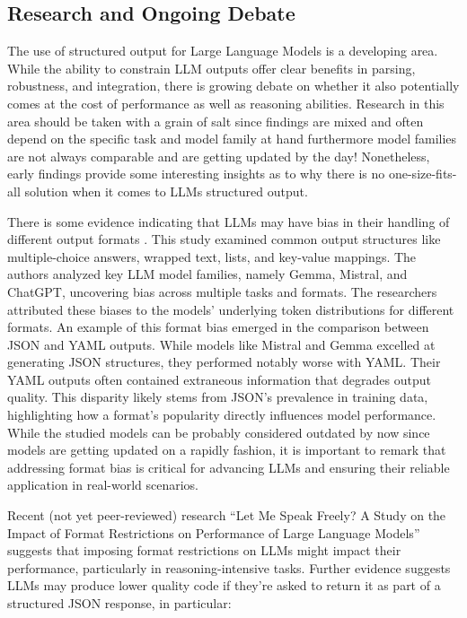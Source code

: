 \subsection{Research and Ongoing Debate}

The use of structured output for Large Language Models is a developing area. While the ability to constrain LLM outputs offer clear benefits in parsing, robustness, and integration, there is growing debate on whether it also potentially comes at the cost of performance as well as reasoning abilities. Research in this area should be taken with a grain of salt since findings are mixed and often depend on the specific task and model family at hand furthermore model families are not always comparable and are getting updated by the day! Nonetheless, early findings provide some interesting insights as to why there is no one-size-fits-all solution when it comes to LLMs structured output.

There is some evidence indicating that LLMs may have bias in their handling of different output formats . This study examined common output structures like multiple-choice answers, wrapped text, lists, and key-value mappings. The authors analyzed key LLM model families, namely Gemma, Mistral, and ChatGPT, uncovering bias across multiple tasks and formats. The researchers attributed these biases to the models' underlying token distributions for different formats. An example of this format bias emerged in the comparison between JSON and YAML outputs. While models like Mistral and Gemma excelled at generating JSON structures, they performed notably worse with YAML. Their YAML outputs often contained extraneous information that degrades output quality. This disparity likely stems from JSON's prevalence in training data, highlighting how a format's popularity directly influences model performance. While the studied models can be probably considered outdated by now since models are getting updated on a rapidly fashion, it is important to remark that addressing format bias is critical for advancing LLMs and ensuring their reliable application in real-world scenarios.

Recent (not yet peer-reviewed) research ``Let Me Speak Freely? A Study on the Impact of Format Restrictions on Performance of Large Language Models''  suggests that imposing format restrictions on LLMs might impact their performance, particularly in reasoning-intensive tasks. Further evidence  suggests LLMs may produce lower quality code if they're asked to return it as part of a structured JSON response, in particular:

